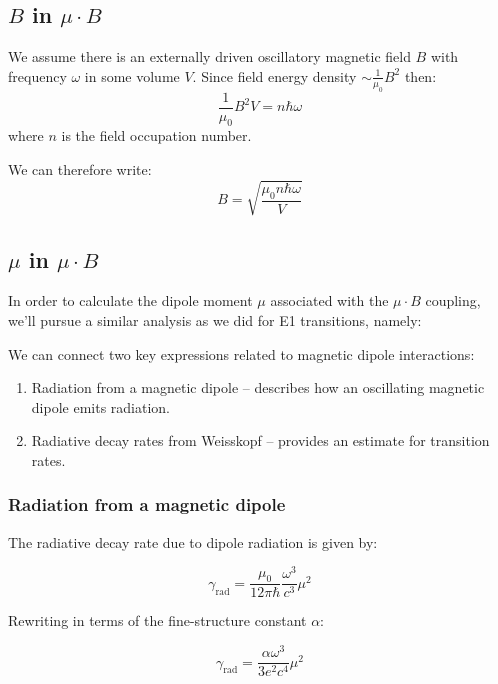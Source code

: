 \documentclass[
]{article}
\renewcommand{\[}{\begin{equation}}
\renewcommand{\]}{\end{equation}}
\providecommand{\tightlist}{%
  \setlength{\itemsep}{0pt}\setlength{\parskip}{0pt}}
\begin{document}
\subsection{\texorpdfstring{\(B\) in
\(\mu\cdot B\)}{B in \textbackslash mu\textbackslash cdot B}}\label{b-in-mucdot-b}

We assume there is an externally driven oscillatory magnetic field \(B\)
with frequency \(\omega\) in some volume \(V\). Since field energy
density \(\sim \frac{1}{\mu_0}B^2\) then: \[
\frac{1}{\mu_0} B^2 V = n\hbar\omega
\] where \(n\) is the field occupation number.

We can therefore write: \[
B = \sqrt{\frac{\mu_0n\hbar\omega}{V}}
\label{eq:B}
\]

\subsection{\texorpdfstring{\(\mu\) in
\(\mu \cdot B\)}{\textbackslash mu in \textbackslash mu \textbackslash cdot B}}\label{mu-in-mu-cdot-b}

In order to calculate the dipole moment \(\mu\) associated with the
\(\mu\cdot B\) coupling, we'll pursue a similar analysis as we did for
E1 transitions, namely:

We can connect two key expressions related to magnetic dipole
interactions:

\begin{enumerate}
\def\labelenumi{\arabic{enumi}.}
\tightlist
\item
  Radiation from a magnetic dipole -- describes how an oscillating
  magnetic dipole emits radiation.
\item
  Radiative decay rates from Weisskopf -- provides an estimate for
  transition rates.
\end{enumerate}

\subsubsection{Radiation from a magnetic
dipole}\label{radiation-from-a-magnetic-dipole}

The radiative decay rate due to dipole radiation is given by:

\[
\gamma_{\text{rad}} = \frac{\mu_0}{12 \pi \hbar} \frac{\omega^3}{c^3} \mu^2
\]

Rewriting in terms of the fine-structure constant \(\alpha\):

\[
\gamma_{\text{rad}} = \frac{\alpha \omega^3}{3 e^2 c^4} \mu^2
\]
\end{document}
